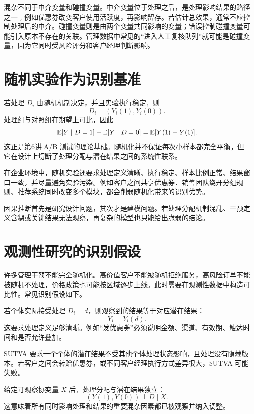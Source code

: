 \documentclass[UTF8,fontset=fandol,openany,zihao=-4]{ctexbook}
\begin{document}
混杂不同于中介变量和碰撞变量。中介变量位于处理之后，是处理影响结果的路径之一；例如优惠券改变客户使用活跃度，再影响留存。若估计总效果，通常不应控制处理后的中介。碰撞变量则是由两个变量共同影响的变量；错误控制碰撞变量可能引入原本不存在的关联。管理数据中常见的“进入人工复核队列”就可能是碰撞变量，因为它同时受风险评分和客户经理判断影响。

\section{随机实验作为识别基准}

若处理 \(D_i\) 由随机机制决定，并且实验执行稳定，则
\[
  D_i\perp (Y_i(1),Y_i(0)).
\]
处理组与对照组在期望上可比，因此
\[
  \mathbb E[Y\mid D=1]-\mathbb E[Y\mid D=0]
  =
  \mathbb E[Y(1)-Y(0)].
\]
这正是第6讲 A/B 测试的理论基础。随机化并不保证每次小样本都完全平衡，但它在设计上切断了处理分配与潜在结果之间的系统性联系。

在企业环境中，随机实验还要求处理定义清晰、执行稳定、样本比例正常、结果窗口一致，并尽量避免实验污染。例如客户之间共享优惠券、销售团队绕开分组规则、推荐系统同时改变多个模块，都会削弱随机化带来的识别优势。

\begin{modernbox}[设计优先]
因果推断首先是研究设计问题，其次才是建模问题。若处理分配机制混乱、干预定义含糊或关键结果无法观察，再复杂的模型也只能给出脆弱的结论。
\end{modernbox}

\section{观测性研究的识别假设}

许多管理干预不能完全随机化。高价值客户不能被随机拒绝服务，高风险订单不能被随机不处理，价格政策也可能按区域逐步上线。此时需要在观测性数据中构造可比性。常见识别假设如下。

\begin{definition}[一致性]
若个体实际接受处理 \(D_i=d\)，则观察到的结果等于对应潜在结果：
\[
  Y_i=Y_i(d).
\]
这要求处理定义足够清晰。例如“发优惠券”必须说明金额、渠道、有效期、触达时间和是否允许叠加。
\end{definition}

\begin{definition}[SUTVA]
SUTVA 要求一个个体的潜在结果不受其他个体处理状态影响，且处理没有隐藏版本。若客户之间会转赠优惠券，或不同客户经理执行方式差异很大，SUTVA 可能失败。
\end{definition}

\begin{definition}[条件可交换性]
给定可观察协变量 \(X\) 后，处理分配与潜在结果独立：
\[
  (Y(1),Y(0))\perp D\mid X.
\]
这意味着所有同时影响处理和结果的重要混杂因素都已被观察并纳入调整。
\end{definition}
\end{document}
